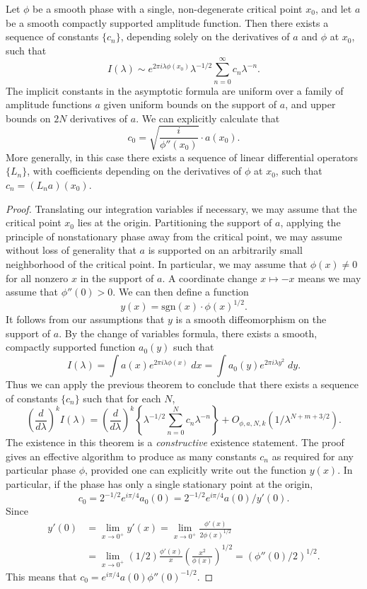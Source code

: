 \begin{theorem}
  Let $\phi$ be a smooth phase with a single, non-degenerate critical point $x_0$, and let $a$ be a smooth compactly supported amplitude function. Then there exists a sequence of constants $\{ c_n \}$, depending solely on the derivatives of $a$ and $\phi$ at $x_0$, such that
  \[ I(\lambda) \sim e^{2 \pi i \lambda \phi(x_0)} \lambda^{-1/2} \sum_{n = 0}^\infty c_n \lambda^{-n}. \]
  The implicit constants in the asymptotic formula are uniform over a family of amplitude functions $a$ given uniform bounds on the support of $a$, and upper bounds on $2N$ derivatives of $a$. We can explicitly calculate that
  \[ c_0 = \sqrt{ \frac{i}{\phi''(x_0)} } \cdot a(x_0). \]
  More generally, in this case there exists a sequence of linear differential operators $\{ L_n \}$, with coefficients depending on the derivatives of $\phi$ at $x_0$, such that $c_n = (L_n a)(x_0)$.
\end{theorem}
\begin{proof}
    Translating our integration variables if necessary, we may assume that the critical point $x_0$ lies at the origin. Partitioning the support of $a$, applying the principle of nonstationary phase away from the critical point, we may assume without loss of generality that $a$ is supported on an arbitrarily small neighborhood of the critical point. In particular, we may assume that $\phi(x) \neq 0$ for all nonzero $x$ in the support of $a$. A coordinate change $x \mapsto -x$ means we may assume that $\phi''(0) > 0$. We can then define a function
  \[ y(x) = \text{sgn}(x) \cdot \phi(x)^{1/2}. \]
  It follows from our assumptions that $y$ is a smooth diffeomorphism on the support of $a$. By the change of variables formula, there exists a smooth, compactly supported function $a_0(y)$ such that
  \[ I(\lambda) = \int a(x) e^{2 \pi i \lambda \phi(x)}\; dx = \int a_0(y) e^{2 \pi i \lambda y^2}\; dy. \]
  Thus we can apply the previous theorem to conclude that there exists a sequence of constants $\{ c_n \}$ such that for each $N$,
  \[ \left( \frac{d}{d\lambda} \right)^k I(\lambda) = \left( \frac{d}{d\lambda} \right)^k \left\{ \lambda^{-1/2} \sum_{n = 0}^N c_n \lambda^{-n} \right\} + O_{\phi,a,N,k}(1/\lambda^{N+m+3/2}). \]
  The existence in this theorem is a \emph{constructive} existence statement. The proof gives an effective algorithm to produce as many constants $c_n$ as required for any particular phase $\phi$, provided one can explicitly write out the function $y(x)$. In particular, if the phase has only a single stationary point at the origin,
  \[ c_0 = 2^{-1/2} e^{i\pi/4} a_0(0) = 2^{-1/2} e^{i\pi/4} a(0) / y'(0). \]
  Since
  \begin{align*}
    y'(0) &= \lim_{x \to 0^+} y'(x) = \lim_{x \to 0^+} \frac{\phi'(x)}{2 \phi(x)^{1/2}}\\
    &= \lim_{x \to 0^+} (1/2) \frac{\phi'(x)}{x} \left( \frac{x^2}{\phi(x)} \right)^{1/2} = (\phi''(0)/2)^{1/2}.
  \end{align*}
  This means that $c_0 = e^{i\pi/4} a(0) \phi''(0)^{-1/2}$.
\end{proof}

